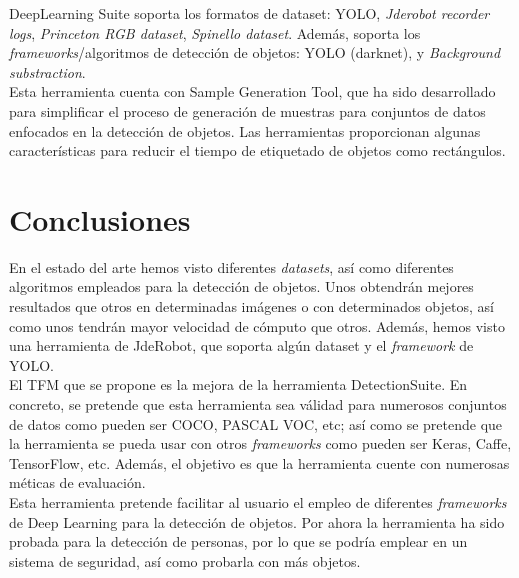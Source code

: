 \documentclass{bmvc2k}
\begin{document}
DeepLearning Suite soporta los formatos de dataset: YOLO, \textit{Jderobot recorder logs}, \textit{Princeton RGB dataset}, \textit{Spinello dataset}. Además, soporta los \textit{frameworks}/algoritmos de detección de objetos: YOLO (darknet), y \textit{Background substraction}.\\

Esta herramienta cuenta con Sample Generation Tool, que ha sido desarrollado para simplificar el proceso de generación de muestras para conjuntos de datos enfocados en la detección de objetos. Las herramientas proporcionan algunas características para reducir el tiempo de etiquetado de objetos como rectángulos.\\


\section{Conclusiones}

En el estado del arte hemos visto diferentes \textit{datasets}, así como diferentes algoritmos empleados para la detección de objetos. Unos obtendrán mejores resultados que otros en determinadas imágenes o con determinados objetos, así como unos tendrán mayor velocidad de cómputo que otros. Además, hemos visto una herramienta de JdeRobot, que soporta algún dataset y el \textit{framework} de YOLO.\\

El TFM que se propone es la mejora de la herramienta DetectionSuite. En concreto, se pretende que esta herramienta sea válidad para numerosos conjuntos de datos como pueden ser COCO, PASCAL VOC, etc; así como se pretende que la herramienta se pueda usar con otros \textit{frameworks} como pueden ser Keras, Caffe, TensorFlow, etc. Además, el objetivo es que la herramienta cuente con numerosas méticas de evaluación.\\

Esta herramienta pretende facilitar al usuario el empleo de diferentes \textit{frameworks} de Deep Learning para la detección de objetos. Por ahora la herramienta ha sido probada para la detección de personas, por lo que se podría emplear en un sistema de seguridad, así como probarla con más objetos.\\





\end{document}
